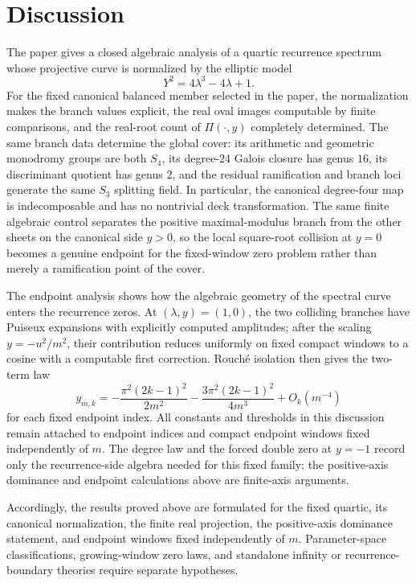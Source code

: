 \section{Discussion}\label{sec:discussion-new}

The paper gives a closed algebraic analysis of a quartic recurrence spectrum whose projective curve is normalized by the elliptic model
\[
Y^2=4\lambda^3-4\lambda+1.
\]
For the fixed canonical balanced member selected in the paper, the normalization makes the branch values explicit, the real oval images computable by finite comparisons, and the real-root count of \(\Pi(\cdot,y)\) completely determined.
The same branch data determine the global cover: its arithmetic and geometric monodromy groups are both $S_4$, its degree-$24$ Galois closure has genus $16$, its discriminant quotient has genus $2$, and the residual ramification and branch loci generate the same $S_3$ splitting field.  In particular, the canonical degree-four map is indecomposable and has no nontrivial deck transformation.
The same finite algebraic control separates the positive maximal-modulus branch from the other sheets on the canonical side \(y>0\), so the local square-root collision at \(y=0\) becomes a genuine endpoint for the fixed-window zero problem rather than merely a ramification point of the cover.

The endpoint analysis shows how the algebraic geometry of the spectral curve enters the recurrence zeros.
At \((\lambda,y)=(1,0)\), the two colliding branches have Puiseux expansions with explicitly computed amplitudes; after the scaling \(y=-u^2/m^2\), their contribution reduces uniformly on fixed compact windows to a cosine with a computable first correction.
Rouch\'e isolation then gives the two-term law
\[
y_{m,k}
=
-\frac{\pi^2(2k-1)^2}{2m^2}
-\frac{3\pi^2(2k-1)^2}{4m^3}
+O_k(m^{-4})
\]
for each fixed endpoint index.
All constants and thresholds in this discussion remain attached to endpoint indices and compact endpoint windows fixed independently of $m$.
The degree law and the forced double zero at \(y=-1\) record only the recurrence-side algebra needed for this fixed family; the positive-axis dominance and endpoint calculations above are finite-axis arguments.

Accordingly, the results proved above are formulated for the fixed quartic, its canonical normalization, the finite real projection, the positive-axis dominance statement, and endpoint windows fixed independently of $m$.  Parameter-space classifications, growing-window zero laws, and standalone infinity or recurrence-boundary theories require separate hypotheses.
